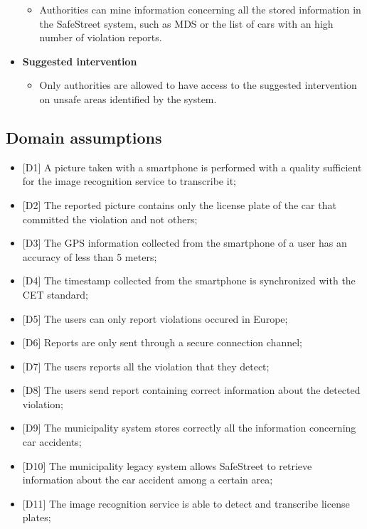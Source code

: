 \begin{itemize}
\begin{itemize}
            \item Authorities can mine information concerning all the stored information in the SafeStreet system, such as MDS or the list of cars with an high number of violation reports.
        \end{itemize}
    \item \textbf{Suggested intervention}
        \begin{itemize}
            \item Only authorities are allowed to have access to the suggested intervention on unsafe areas identified by the system.
        \end{itemize}
    \end{itemize}
\subsection{Domain assumptions}
\begin{itemize}
    \item {[D1]}  A picture taken with a smartphone is performed with a quality sufficient for the image recognition service to transcribe it;
    \item {[D2]}  The reported picture contains only the license plate of the car that committed the violation and not others;
    \item {[D3]}  The GPS information collected from the smartphone of a user has an accuracy of less than 5 meters;
    \item {[D4]} The timestamp collected from the smartphone is synchronized with the CET standard;
    \item {[D5]} The users can only report violations occured in Europe;
    \item {[D6]} Reports are only sent through a secure connection channel;
    \item {[D7]} The users reports all the violation that they detect;
    \item {[D8]} The users send report containing correct information about the detected violation;
    \item {[D9]} The municipality system stores correctly all the information concerning car accidents;
    \item {[D10]} The municipality legacy system allows SafeStreet to retrieve information about the car accident among a certain area;
    \item {[D11]} The image recognition service is able to detect and transcribe license plates;
\end{itemize}


